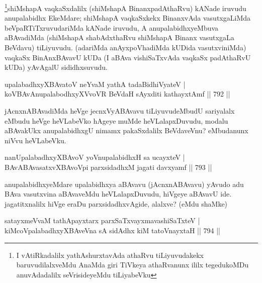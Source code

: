 \begin{artha}
\footnote{I vAtiRkadalilx yathAshurxtavAda athaRvu tiLiyuvudakekx baruvudilalxveMdu AnaMda giri TiVkeya athaRvanunx ililx tegedukoMDu anuvAdadalilx seVrisideyeMdu tiLiyabeVku}shiMshapA vaqkaSxdalilx (shiMshapA BinanxpadAthaRvu) kANade iruvudu anupalabidhx EkeMdare; shiMshapA vaqkaSxkekx BinanxvAda vasutxgaLiMda beVpaRTiTxruvudariMda kANade iruvudu, A anupalabidhxyeMbuva aBAvadiMda (shiMshapA shabAdxthaRvu shiMshapA Binanx vasutxgaLa BeVdavu) tiLiyuvudu. (adariMda anAyxpoVhadiMda kUDida vasutxviniMda) vaqkaSx BinAnxBAvavU kUDa (I aBAva vishiSaTxvAda vaqkaSx padAthaRvU kUDa) yAvAgalU sididhxsuvudu.
\end{artha}


\begin{shl}
upalabadhxyXBAvatoV neYvaM yathA tadaBidhiVyateV | \\
koV\s BAvAnupalabodhxyXVvoVR BeVdaH sAyxditi kathayxtAmf \hfill||  792 ||  
\end{shl}

\begin{artha}
jAcnxnABAvadiMda heVge jecnxVyABAvavu tiLiyuvudeMbudU sariyalalx eMbudu heVge heVLabeVko hAgeye muMde heVLalapxDuvudu, modalu aBAvakUkx anupalabidhxgU nimamx pakaSxdalilx BeVdaveVnu? eMbudanunx niVvu heVLabeVku.
\end{artha}


\begin{shl}
nanUpalabadhxyXBAvoV yoV\s nupalabidhxH sa ucayxteV | \\
BAvABAvasatxvXBAvoV\s pi parxsidadhxM jagati davxyamf \hfill||  793 ||  
\end{shl}

\begin{artha}
anupalabidhxyeMdare upalabidhxya aBAvavu (jAcnxnABAvavu) yAvudo adu BAva vasutxvina aBAvaveMdu heVLalapxDuvudu, hiVgeye aBAvavU ide. jagatitxnalilx hiVge eraDu parxsidadhxvAgide, alalxve? (eMdu shaMke)
\end{artha}


\begin{shl}
satayxmeVvaM tathA\s payxtarx parxSaTxvayxmavashiSaTxteV | \\
kiMcoVpalabadhxyXBAveVna sA sidAdhx kiM tatoV\s nayxtaH \hfill||  794 ||  
\end{shl}

